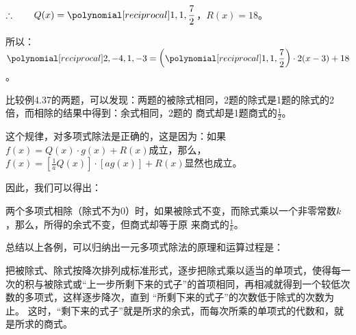 \begin{solution}
\begin{center}
       \end{center}
$\therefore\qquad Q(x)=\poly{1,1,\frac{7}{2}}$，$R(x)=18$。

所以：$\poly{2,-4,1,-3}=\left(\poly{1,1,\frac{7}{2}}\right)\cdot 2(x-3)+18$。
\end{solution}

比较例4.37的两题，可以发现：两题的被除式相同，2题的除式是1题的除式的2倍，而相除的结果中得到：余式相同，2题的
商式却是1题商式的$\frac{1}{2}$。

这个规律，对多项式除法是正确的，这是因为：如果$f(x)=Q(x)\cdot g(x)+R(x)$成立，那么，$f(x)=\left[\frac{1}{a}Q(x)\right]\cdot [ag(x)]+R(x)$显然也成立。

因此，我们可以得出：

\begin{blk}{}
    两个多项式相除（除式不为0）时，如果被除式不变，而除式乘以一个非零常数$k$，那么，所得的余式不变，但商式却等于原
来商式的$\frac{1}{k}$。
\end{blk}

总结以上各例，可以归纳出一元多项式除法的原理和运算过程是：

把被除式、除式按降次排列成标准形式，逐步把除式乘以适当的单项式，使得每一次的积与被除式或“上一步所剩下来的式子”的首项相同，再相减就得到一个较低次数的多项式，这样逐步降次，直到
“所剩下来的式子”的次数低于除式的次数为止。
这时，“剩下来的式子”就是所求的余式，而每次所乘的单项式的代数和，就是所求的商式。

